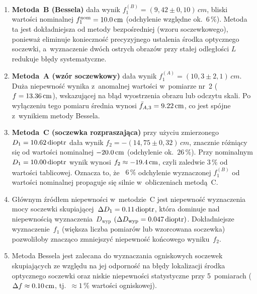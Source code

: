 \documentclass[a4paper,12pt]{article}
\begin{document}
\begin{enumerate}
  \item \textbf{Metoda~B (Bessela)} dała wynik $f_1^{(B)} = (9{,}42 \pm 0{,}10)\,\si{cm}$,
        bliski wartości nominalnej $f_1^{\text{nom}} = \SI{10{,}0}{cm}$
        (odchylenie względne ok.~$6\,\%$). Metoda ta jest dokładniejsza od metody
        bezpośredniej (wzoru soczewkowego), ponieważ eliminuje konieczność precyzyjnego
        ustalenia środka optycznego soczewki, a~wyznaczenie dwóch ostrych obrazów przy
        stałej odległości $L$ redukuje błędy systematyczne.

  \item \textbf{Metoda~A (wzór soczewkowy)} dała wynik $f_1^{(A)} = (10{,}3 \pm 2{,}1)\,\si{cm}$.
        Duża niepewność wynika z~anomalnej wartości w~pomiarze nr~2
        ($f = \SI{13{,}36}{cm}$), wskazującej na błąd wyostrzenia obrazu lub odczytu
        skali. Po wyłączeniu tego pomiaru średnia wynosi $\bar{f}_{A,3} = \SI{9{,}22}{cm}$,
        co jest spójne z~wynikiem metody Bessela.

  \item \textbf{Metoda~C (soczewka rozpraszająca)} przy użyciu zmierzonego
        $D_1 = \SI{10{,}62}{dioptr}$ dała wynik $f_2 = -(14{,}75 \pm 0{,}32)\,\si{cm}$,
        znacznie różniący się od wartości nominalnej $\SI{-20{,}0}{cm}$
        (odchylenie ok.~$26\,\%$). Przy nominalnym $D_1 = \SI{10{,}00}{dioptr}$
        wynik wynosi $f_2 \approx \SI{-19{,}4}{cm}$, czyli zaledwie $3\,\%$ od wartości
        tablicowej. Oznacza to, że ~$6\,\%$ odchylenie wyznaczonej $f_1^{(B)}$ od
        wartości nominalnej propaguje się silnie w~obliczeniach metodą~C.

  \item Głównym źródłem niepewności w~metodzie~C jest niepewność wyznaczenia mocy
        soczewki skupiającej~$\Delta D_1 = \SI{0{,}11}{dioptr}$, która dominuje nad
        niepewnością wyznaczenia~$D_\text{wyp}$ $(\Delta D_\text{wyp} = \SI{0{,}047}{dioptr})$.
        Dokładniejsze wyznaczenie~$f_1$ (większa liczba pomiarów lub wzorcowana soczewka)
        pozwoliłoby znacząco zmniejszyć niepewność końcowego wyniku~$f_2$.

  \item Metoda Bessela jest zalecana do wyznaczania ogniskowych soczewek skupiających
        ze względu na jej odporność na błędy lokalizacji środka optycznego soczewki
        oraz niskie niepewności statystyczne przy 5~pomiarach ($\Delta f \approx \SI{0{,}10}{cm}$,
        tj.~$\approx 1\,\%$ wartości ogniskowej).
\end{enumerate}
\end{document}
